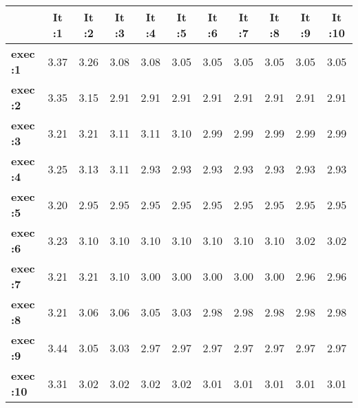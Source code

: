 \begin{tiny}\begin{tabular}{|l|c|c|c|c|c|c|c|c|c|c|}
\hline
&\textbf{It :1}&\textbf{It :2}&\textbf{It :3}&\textbf{It :4}&\textbf{It :5}&\textbf{It :6}&\textbf{It :7}&\textbf{It :8}&\textbf{It :9}&\textbf{It :10}\\\hline
\textbf{exec :1}&3.37&3.26&3.08&3.08&3.05&3.05&3.05&3.05&3.05&3.05\\\hline
\textbf{exec :2}&3.35&3.15&2.91&2.91&2.91&2.91&2.91&2.91&2.91&2.91\\\hline
\textbf{exec :3}&3.21&3.21&3.11&3.11&3.10&2.99&2.99&2.99&2.99&2.99\\\hline
\textbf{exec :4}&3.25&3.13&3.11&2.93&2.93&2.93&2.93&2.93&2.93&2.93\\\hline
\textbf{exec :5}&3.20&2.95&2.95&2.95&2.95&2.95&2.95&2.95&2.95&2.95\\\hline
\textbf{exec :6}&3.23&3.10&3.10&3.10&3.10&3.10&3.10&3.10&3.02&3.02\\\hline
\textbf{exec :7}&3.21&3.21&3.10&3.00&3.00&3.00&3.00&3.00&2.96&2.96\\\hline
\textbf{exec :8}&3.21&3.06&3.06&3.05&3.03&2.98&2.98&2.98&2.98&2.98\\\hline
\textbf{exec :9}&3.44&3.05&3.03&2.97&2.97&2.97&2.97&2.97&2.97&2.97\\\hline
\textbf{exec :10}&3.31&3.02&3.02&3.02&3.02&3.01&3.01&3.01&3.01&3.01\\\hline
\end{tabular}
\end{tiny}